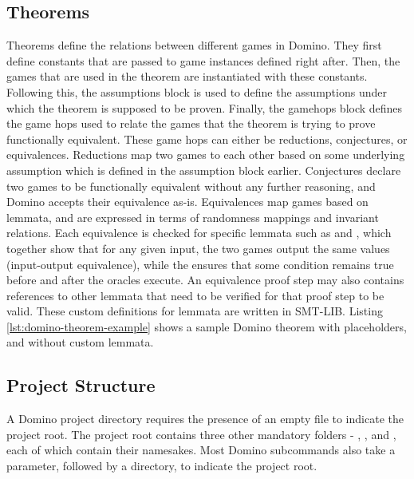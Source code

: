 

\subsection{Theorems}
\label{subsec:theorems}
Theorems define the relations between different games in Domino. They first define constants that are passed to game instances defined right after. Then, the games that are used in the theorem are instantiated with these constants. Following this, the assumptions block is used to define the assumptions under which the theorem is supposed to be proven. Finally, the gamehops block defines the game hops used to relate the games that the theorem is trying to prove functionally equivalent. These game hops can either be reductions, conjectures, or equivalences. Reductions map two games to each other based on some underlying assumption which is defined in the assumption block earlier. Conjectures declare two games to be functionally equivalent without any further reasoning, and Domino accepts their equivalence as-is. Equivalences map games based on lemmata, and are expressed in terms of randomness mappings and invariant relations. Each equivalence is checked for specific lemmata such as  and , which together show that for any given input, the two games output the same values (input-output equivalence), while the  ensures that some condition remains true before and after the oracles execute. An equivalence proof step may also contains references to other lemmata that need to be verified for that proof step to be valid. These custom definitions for lemmata are written in SMT-LIB. Listing \ref{lst:domino-theorem-example} shows a sample Domino theorem with placeholders, and without custom lemmata.



\subsection{Project Structure}
\label{subsec:projectstructure}
A Domino project directory requires the presence of an empty  file to indicate the project root. The project root contains three other mandatory folders - , , and , each of which contain their namesakes. Most Domino subcommands also take a  parameter, followed by a directory, to indicate the project root. 

